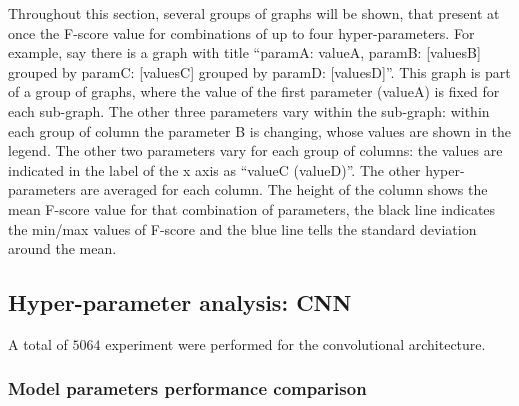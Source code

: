 Throughout this section, several groups of graphs will be shown, that present
at once the F-score value for combinations of up to four hyper-parameters.
For example, say there is a graph 
with title 
``paramA: valueA, paramB: [valuesB]
grouped by paramC: [valuesC]
grouped by paramD: [valuesD]''.
This graph is part of a group of graphs, where the value of the first parameter
(valueA) is fixed for each sub-graph.
The other three parameters vary within the sub-graph:
within each group of column the parameter B is changing,
whose values are shown in the legend.
The other two parameters vary for each group of columns:
the values are indicated in the label of the x axis as ``valueC (valueD)''.
The other hyper-parameters are averaged for each column.
The height of the column shows the mean F-score value for that
combination of parameters,
the black line indicates the min/max values of F-score and the
blue line tells the standard deviation around the mean.

\subsection{Hyper-parameter analysis: CNN}


A total of $5064$
experiment were performed for the convolutional architecture.

\subsubsection{Model parameters performance comparison}


